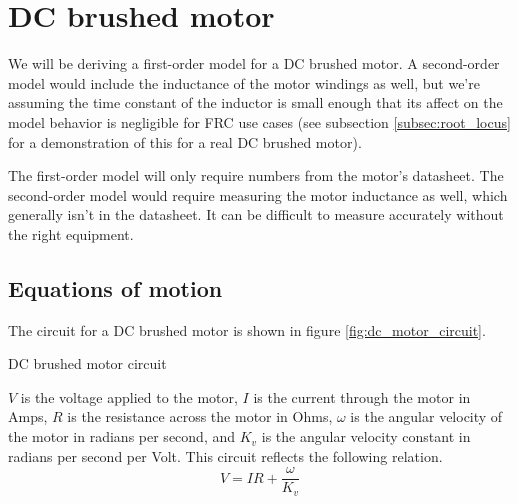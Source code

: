 \section{DC brushed motor}
\label{sec:dc_brushed_motor}

We will be deriving a first-order \gls{model} for a DC brushed motor. A
second-order \gls{model} would include the inductance of the motor windings as
well, but we're assuming the time constant of the inductor is small enough that
its affect on the \gls{model} behavior is negligible for FRC use cases (see
subsection \ref{subsec:root_locus} for a demonstration of this for a real DC
brushed motor).

The first-order \gls{model} will only require numbers from the motor's
datasheet. The second-order \gls{model} would require measuring the motor
inductance as well, which generally isn't in the datasheet. It can be difficult
to measure accurately without the right equipment.

\subsection{Equations of motion}

The circuit for a DC brushed motor is shown in figure
\ref{fig:dc_motor_circuit}.
\begin{bookfigure}

  \caption{DC brushed motor circuit}
  \label{fig:dc_motor_circuit}
\end{bookfigure}

$V$ is the voltage applied to the motor, $I$ is the current through the motor in
Amps, $R$ is the resistance across the motor in Ohms, $\omega$ is the angular
velocity of the motor in radians per second, and $K_v$ is the angular velocity
constant in radians per second per Volt. This circuit reflects the following
relation.
\begin{equation}
  V = IR + \frac{\omega}{K_v} \label{eq:motor_V}
\end{equation}


